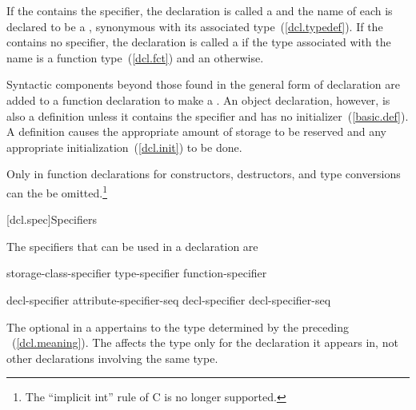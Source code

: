 \pnum
If the  contains the 
specifier, the declaration is called a  and the name
of each 
is declared to be a , synonymous with its
associated type~(\ref{dcl.typedef}). If the
 contains no  specifier, the
declaration is called a  if
the type associated with the name is a function type~(\ref{dcl.fct}) and
an  otherwise.

\pnum
{}%
Syntactic components beyond those found in the general form of
declaration are added to a function declaration to make a
. An object declaration, however, is also
a definition unless it contains the  specifier and has no
initializer~(\ref{basic.def}).
%
A
definition causes the appropriate amount of storage to be reserved and
any appropriate initialization~(\ref{dcl.init}) to be done.

\pnum
Only in function declarations for constructors, destructors, and type
conversions can the  be omitted.\footnote{The
``implicit int'' rule of C is no longer supported.}

[dcl.spec]{Specifiers}%

\pnum
{}%
The specifiers that can be used in a declaration are

\begin{bnf}
\br
    storage-class-specifier\br
    type-specifier\br
    function-specifier\br
    \br
    \br
\end{bnf}

\begin{bnf}
\br
    decl-specifier attribute-specifier-seq\opt\br
    decl-specifier decl-specifier-seq
\end{bnf}

The optional  in a 
appertains to the type determined by the preceding
~(\ref{dcl.meaning}). The 
affects the type only for the declaration it appears in, not other declarations involving the
same type.

